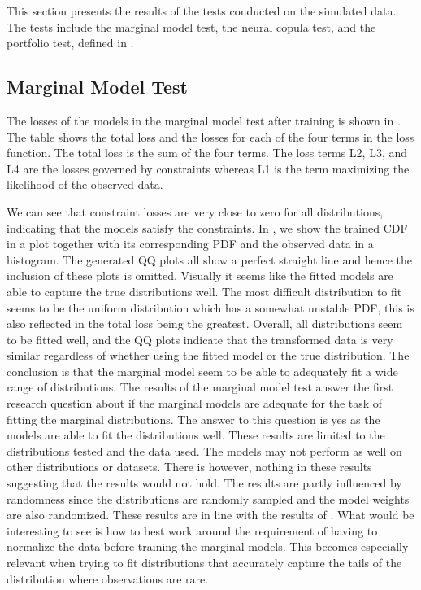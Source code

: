 This section presents the results of the tests conducted on the simulated data. The tests include the marginal model test, the neural copula test, and the portfolio test, defined in .

\subsection{Marginal Model Test}
The losses of the models in the marginal model test after training is shown in . The table shows the total loss and the losses for each of the four terms in the loss function. The total loss is the sum of the four terms. The loss terms L2, L3, and L4 are the losses governed by constraints whereas L1 is the term maximizing the likelihood of the observed data. 

We can see that constraint losses are very close to zero for all distributions, indicating that the models satisfy the constraints. In , we show the trained \gls{CDF} in a plot together with its corresponding \gls{PDF} and the observed data in a histogram. The generated QQ plots all show a perfect straight line and hence the inclusion of these plots is omitted. Visually it seems like the fitted models are able to capture the true distributions well. The most difficult distribution to fit seems to be the uniform distribution which has a somewhat unstable \gls{PDF}, this is also reflected in the total loss being the greatest. Overall, all distributions seem to be fitted well, and the QQ plots indicate that the transformed data is very similar regardless of whether using the fitted model or the true distribution. The conclusion is that the marginal model seem to be able to adequately fit a wide range of distributions. The results of the marginal model test answer the first research question \RQone about if the marginal models are adequate for the task of fitting the marginal distributions. The answer to this question is yes as the models are able to fit the distributions well. These results are limited to the distributions tested and the data used. The models may not perform as well on other distributions or datasets. There is however, nothing in these results suggesting that the results would not hold. The results are partly influenced by randomness since the distributions are randomly sampled and the model weights are also randomized. These results are in line with the results of . What would be interesting to see is how to best work around the requirement of having to normalize the data before training the marginal models. This becomes especially relevant when trying to fit distributions that accurately capture the tails of the distribution where observations are rare.  


